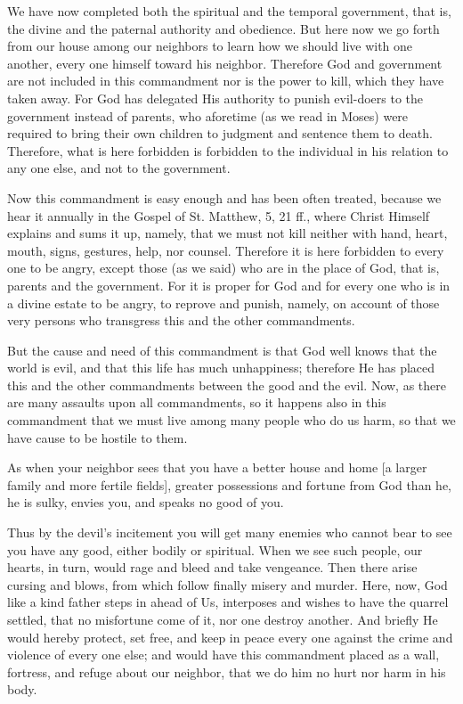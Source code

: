 We have now completed both the spiritual and the temporal government,
that is, the divine and the paternal authority and obedience. But here
now we go forth from our house among our neighbors to learn how we
should live with one another, every one himself toward his neighbor.
Therefore God and government are not included in this commandment nor
is the power to kill, which they have taken away. For God has delegated
His authority to punish evil-doers to the government instead of
parents, who aforetime (as we read in Moses) were required to bring
their own children to judgment and sentence them to death. Therefore,
what is here forbidden is forbidden to the individual in his relation
to any one else, and not to the government.

Now this commandment is easy enough and has been often treated,
because we hear it annually in the Gospel of St. Matthew, 5, 21 ff.,
where Christ Himself explains and sums it up, namely, that we must not
kill neither with hand, heart, mouth, signs, gestures, help, nor
counsel. Therefore it is here forbidden to every one to be angry,
except those (as we said) who are in the place of God, that is, parents
and the government. For it is proper for God and for every one who is
in a divine estate to be angry, to reprove and punish, namely, on
account of those very persons who transgress this and the other
commandments.

But the cause and need of this commandment is that God well knows that
the world is evil, and that this life has much unhappiness; therefore
He has placed this and the other commandments between the good and the
evil. Now, as there are many assaults upon all commandments, so it
happens also in this commandment that we must live among many people
who do us harm, so that we have cause to be hostile to them.

As when your neighbor sees that you have a better house and home [a
larger family and more fertile fields], greater possessions and fortune
from God than he, he is sulky, envies you, and speaks no good of you.

Thus by the devil's incitement you will get many enemies who cannot
bear to see you have any good, either bodily or spiritual. When we see
such people, our hearts, in turn, would rage and bleed and take
vengeance. Then there arise cursing and blows, from which follow
finally misery and murder. Here, now, God like a kind father steps in
ahead of Us, interposes and wishes to have the quarrel settled, that no
misfortune come of it, nor one destroy another. And briefly He would
hereby protect, set free, and keep in peace every one against the crime
and violence of every one else; and would have this commandment placed
as a wall, fortress, and refuge about our neighbor, that we do him no
hurt nor harm in his body.

